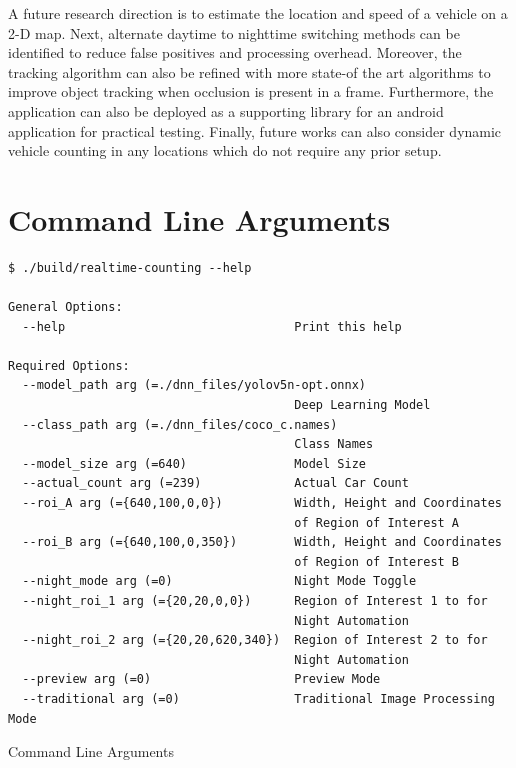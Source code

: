 \documentclass[12pt,a4paper,fleqn]{report}
\begin{document}
A future research direction is to estimate the location and speed of a vehicle on a 2-D map.
Next, alternate daytime to nighttime switching methods can be identified to reduce false positives
and processing overhead.
Moreover, the tracking algorithm can also be refined with more state-of the art algorithms to
improve object tracking when occlusion is present in a frame.
Furthermore, the application can also be deployed as a supporting library for an android application
for practical testing.
Finally, future works can also consider dynamic vehicle counting in any locations which do not
require any prior setup.



{}

\clearpage
\appendix
\chapter{Command Line Arguments}

\begin{listing}[htbp]
\begin{verbatim}
$ ./build/realtime-counting --help

General Options:
  --help                                Print this help

Required Options:
  --model_path arg (=./dnn_files/yolov5n-opt.onnx)
                                        Deep Learning Model
  --class_path arg (=./dnn_files/coco_c.names)
                                        Class Names
  --model_size arg (=640)               Model Size
  --actual_count arg (=239)             Actual Car Count
  --roi_A arg (={640,100,0,0})          Width, Height and Coordinates
                                        of Region of Interest A
  --roi_B arg (={640,100,0,350})        Width, Height and Coordinates
                                        of Region of Interest B
  --night_mode arg (=0)                 Night Mode Toggle
  --night_roi_1 arg (={20,20,0,0})      Region of Interest 1 to for
                                        Night Automation
  --night_roi_2 arg (={20,20,620,340})  Region of Interest 2 to for
                                        Night Automation
  --preview arg (=0)                    Preview Mode
  --traditional arg (=0)                Traditional Image Processing Mode

\end{verbatim}
\caption{Command Line Arguments}
\label{lst:cla}
\end{listing}
\end{document}
